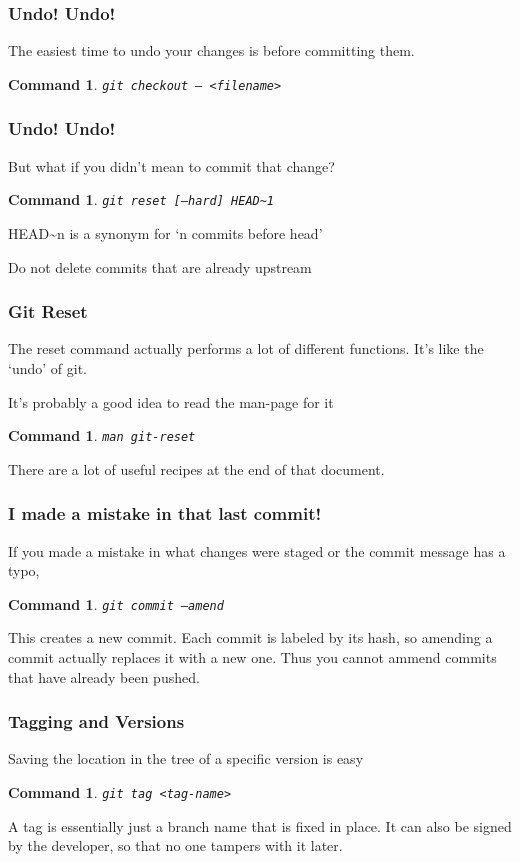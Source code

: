 \documentclass{beamer}
\newtheorem{command}[theorem]{Command}
\begin{document}
\begin{frame}
    \frametitle{Undo! Undo!}
    The easiest time to undo your changes is before committing them.
    \begin{command}
        \texttt{git checkout -- <filename>}
    \end{command}
\end{frame}



\begin{frame}
    \frametitle{Undo! Undo!}
    But what if you didn't mean to commit that change?
    \begin{command}
        \texttt{git reset [--hard] HEAD\~{}1}
    \end{command}
    \pause
    HEAD\~{}n is a synonym for `n commits before head'

    \pause
    \alert{Do not delete commits that are already upstream}
\end{frame}

\begin{frame}
    \frametitle{Git Reset}
    The reset command actually performs a lot of different functions. It's like the `undo' of git.

    It's probably a good idea to read the man-page for it
    \begin{command}
        \texttt{man git-reset}
    \end{command}

    There are a lot of useful recipes at the end of that document.
\end{frame}

\begin{frame}
    \frametitle{I made a mistake in that last commit!}
    If you made a mistake in what changes were staged or the commit message has a typo,
    \begin{command}
        \texttt{git commit --amend}
    \end{command}
    \pause
    \alert{This creates a new commit}. Each commit is labeled by its hash, so amending a commit actually replaces it with a new one. Thus you cannot ammend commits that have already been pushed.
\end{frame}

\begin{frame}
    \frametitle{Tagging and Versions}
    Saving the location in the tree of a specific version is easy
    \begin{command}
        \texttt{git tag <tag-name>}
    \end{command}
    A tag is essentially just a branch name that is fixed in place. It can also be signed by the developer, so that no one tampers with it later.
\end{frame}
\end{document}
